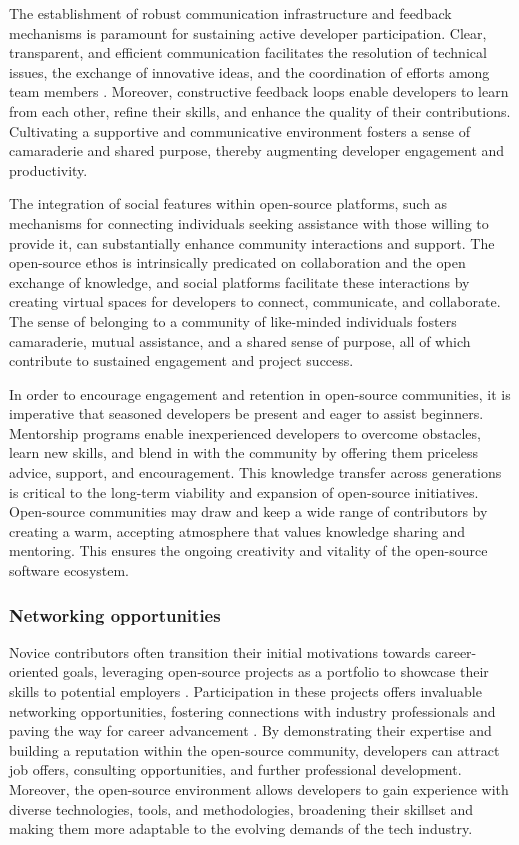 The establishment of robust communication infrastructure and feedback mechanisms is paramount for sustaining active developer participation. Clear, transparent, and efficient communication facilitates the resolution of technical issues, the exchange of innovative ideas, and the coordination of efforts among team members \citep{05bitzer2007intrinsic,13li2012leadership}. Moreover, constructive feedback loops enable developers to learn from each other, refine their skills, and enhance the quality of their contributions. Cultivating a supportive and communicative environment fosters a sense of camaraderie and shared purpose, thereby augmenting developer engagement and productivity.

The integration of social features within open-source platforms, such as mechanisms for connecting individuals seeking assistance with those willing to provide it, can substantially enhance community interactions and support. The open-source ethos is intrinsically predicated on collaboration and the open exchange of knowledge, and social platforms facilitate these interactions by creating virtual spaces for developers to connect, communicate, and collaborate. The sense of belonging to a community of like-minded individuals fosters camaraderie, mutual assistance, and a shared sense of purpose, all of which contribute to sustained engagement and project success.

In order to encourage engagement and retention in open-source communities, it is imperative that seasoned developers be present and eager to assist beginners. Mentorship programs enable inexperienced developers to overcome obstacles, learn new skills, and blend in with the community by offering them priceless advice, support, and encouragement. This knowledge transfer across generations is critical to the long-term viability and expansion of open-source initiatives. Open-source communities may draw and keep a wide range of contributors by creating a warm, accepting atmosphere that values knowledge sharing and mentoring. This ensures the ongoing creativity and vitality of the open-source software ecosystem.



\subsubsection{Networking opportunities}
Novice contributors often transition their initial motivations towards career-oriented goals, leveraging open-source projects as a portfolio to showcase their skills to potential employers \citep{05bitzer2007intrinsic,11gerosa2021shifting}. Participation in these projects offers invaluable networking opportunities, fostering connections with industry professionals and paving the way for career advancement \citep{10wu2007empirical,11gerosa2021shifting,13li2012leadership}. By demonstrating their expertise and building a reputation within the open-source community, developers can attract job offers, consulting opportunities, and further professional development. Moreover, the open-source environment allows developers to gain experience with diverse technologies, tools, and methodologies, broadening their skillset and making them more adaptable to the evolving demands of the tech industry.

